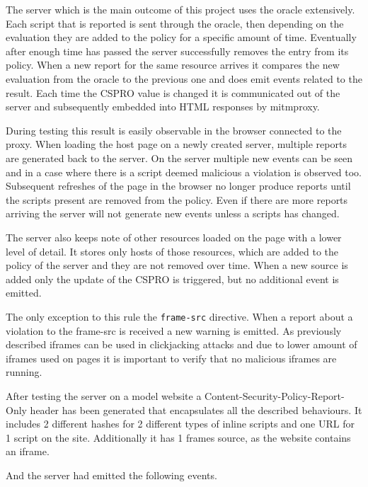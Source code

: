 The server which is the main outcome of this project uses the oracle extensively.
Each script that is reported is sent through the oracle, then depending on the evaluation they are added to the policy for a specific amount of time.
Eventually after enough time has passed the server successfully removes the entry from its policy.
When a new report for the same resource arrives it compares the new evaluation from the oracle to the previous one and does emit events related to the result.
Each time the CSPRO value is changed it is communicated out of the server and subsequently embedded into HTML responses by mitmproxy.

During testing this result is easily observable in the browser connected to the proxy.
When loading the host page on a newly created server, multiple reports are generated back to the server.
On the server multiple new events can be seen and in a case where there is a script deemed malicious a violation is observed too.
Subsequent refreshes of the page in the browser no longer produce reports until the scripts present are removed from the policy.
Even if there are more reports arriving the server will not generate new events unless a scripts has changed.

The server also keeps note of other resources loaded on the page with a lower level of detail.
It stores only hosts of those resources, which are added to the policy of the server and they are not removed over time.
When a new source is added only the update of the CSPRO is triggered, but no additional event is emitted.

The only exception to this rule the \texttt{frame-src} directive. 
When a report about a violation to the frame-src is received a new warning is emitted.
As previously described iframes can be used in clickjacking attacks and due to lower amount of iframes used on pages it is important to verify that no malicious iframes are running.

After testing the server on a model website a Content-Security-Policy-Report-Only header has been generated that encapsulates all the described behaviours.
It includes 2 different hashes for 2 different types of inline scripts and one URL for 1 script on the site.
Additionally it has 1 frames source, as the website contains an iframe.



And the server had emitted the following events.



